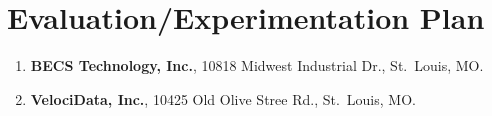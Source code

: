 \section{Evaluation/Experimentation Plan}
\label{sec:eval}

\begin{enumerate}

\item {\bf BECS Technology, Inc.}, 10818 Midwest Industrial Dr., St.~Louis, MO.

\item {\bf VelociData, Inc.}, 10425 Old Olive Stree Rd., St.~Louis, MO.

\end{enumerate}
